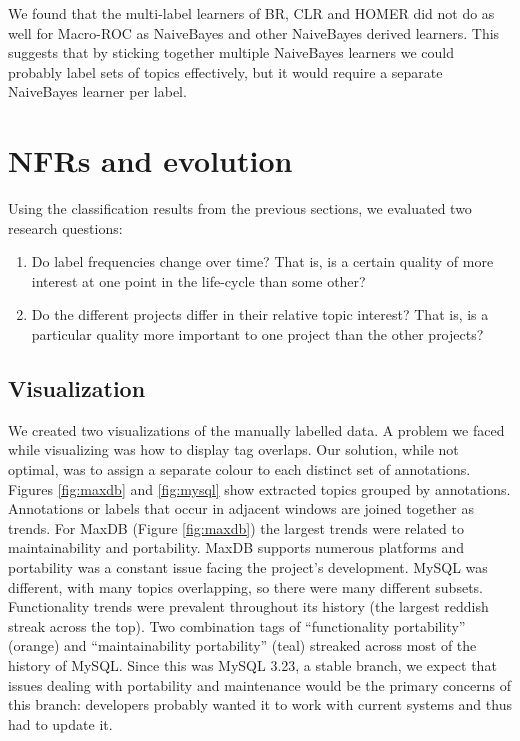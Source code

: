 \documentclass[]{sig-alternate}
\begin{document}
We found that the multi-label learners of BR, CLR and HOMER did not do as well for Macro-ROC as NaiveBayes and other NaiveBayes derived learners. This suggests that by sticking together multiple NaiveBayes learners we could probably label sets of topics effectively, but it would require a separate NaiveBayes learner per label.

\section{NFRs and evolution} 
Using the classification results from the previous sections, we evaluated two research questions:
\begin{enumerate}
\item Do label frequencies change over time? That is, is a certain quality of more interest at one point in the life-cycle than some other? 
\item  Do the different projects differ in their relative topic interest? That is, is a particular quality more important to one project than the other projects?  
\end{enumerate}


\subsection{Visualization}
We created two visualizations of the manually labelled data. A problem we faced while visualizing was how to display tag overlaps. Our solution, while not optimal, was to assign a separate colour to each distinct set of annotations. Figures \ref{fig:maxdb} and \ref{fig:mysql} show extracted topics grouped by annotations. Annotations or labels that occur in adjacent windows are joined together as trends. For MaxDB (Figure \ref{fig:maxdb}) the largest trends were related to maintainability and portability. MaxDB supports numerous platforms and portability was a constant issue facing the project's development. MySQL was different, with many topics overlapping, so there were many different subsets. Functionality trends were prevalent throughout its history (the largest reddish streak across the top). Two combination  tags of ``functionality portability'' (orange) and ``maintainability portability'' (teal) streaked across most of the history of MySQL. Since this was MySQL 3.23, a stable branch, we expect that issues dealing with portability and maintenance would be the primary concerns of this branch: developers probably wanted it to work with current systems and thus had to update it.
\end{document}
